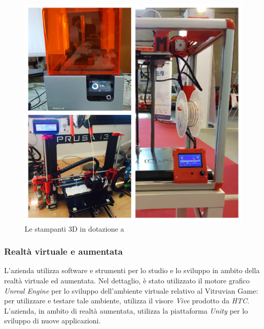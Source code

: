 \begin{figure}[H]
	\begin{center}
	\includegraphics[scale=0.08]{immagini/stampanti.jpg}
	\caption{Le stampanti 3D in dotazione a \lab{}}
	\end{center}
\end{figure}

\subsubsection{Realtà virtuale e aumentata}
L'azienda utilizza software e strumenti per lo studio e lo sviluppo in ambito della realtà virtuale ed aumentata.
Nel dettaglio, è stato utilizzato il motore grafico \textit{Unreal Engine} per lo sviluppo dell'ambiente virtuale relativo al Vitruvian Game: per utilizzare e testare tale ambiente, \lab{} utilizza il visore \textit{Vive} prodotto da \textit{HTC}.\\
L'azienda, in ambito di realtà aumentata, utilizza la piattaforma \textit{Unity} per lo sviluppo di nuove applicazioni.\\

